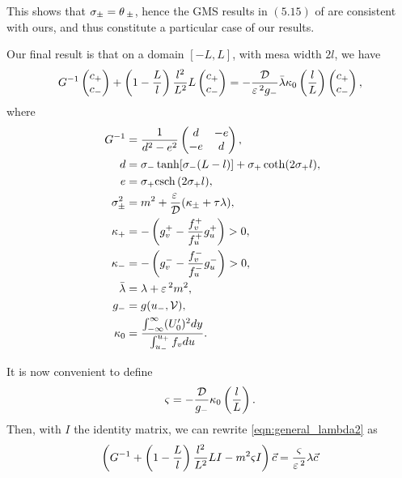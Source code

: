 This shows that $\sigma_{\pm} = \theta\,_{\pm}$, hence the GMS results in $(5.15)$ of \cite{kolokolnikov_stability_2005} are consistent with ours, and thus constitute a particular case of our results.

Our final result is that on a domain $[-L,L]$, with mesa width $2l$, we have
% 
\begin{equation}
\label{eqn:general_lambda2}
  G^{-1}\begin{pmatrix} c_+\\c_- \end{pmatrix} + \left(1-\frac{L}{l} \right)\frac{l^2}{L^2}L\begin{pmatrix} c_+\\c_- \end{pmatrix} = - \frac{\mathcal{D}}{\varepsilon\,^2g_-}\bar{\lambda}\kappa_0\left(\frac{l}{L}\right)\begin{pmatrix} c_+\\c_- \end{pmatrix},
\end{equation}
% 
where
% 
\[
\begin{split}
\begin{aligned}
  G^{-1} &= \frac{1}{d^2-e^2}\begin{pmatrix} d&-e\\-e&d \end{pmatrix},\\
  d&= \sigma_-\tanh[\sigma_-(L-l)] + \sigma_+\coth(2\sigma_+l),\\
  e&= \sigma_+\mathrm{csch} \,(2\sigma_+l),\\
  \quad\sigma_{\pm}^2 &= m^2  + \frac{\varepsilon\,}{\mathcal{D}}(\kappa_{\pm} + \tau\lambda),\\
  \kappa_+ &= - \left(g_v^+ - \frac{f_v^+}{f_u^+}g_u^+ \right)>0,\\
  \kappa_- &= - \left(g_v^- - \frac{f_v^-}{f_u^-}g_u^- \right)>0,\\
  \bar{\lambda} &= \lambda + \varepsilon\,^2m^2,\\
  g_- &= g(u_-,\mathcal{V}),\\
  \kappa_0&=\dfrac{\int_{-\infty}^{\infty}(U_0')^2 dy}{\int_{u_-}^{u_+}f_vdu}.
\end{aligned}
\end{split}
\]
%

It is now convenient to define
% 
\[
  \varsigma = -\frac{\mathcal{D}}{g_-}\kappa_0\left(\frac{l}{L} \right).
\]
% 
Then, with $I$ the identity matrix, we can rewrite \eqref{eqn:general_lambda2} as
% 
\[
  \left(G^{-1} + \left(1-\frac{L}{l} \right)\frac{l^2}{L^2}LI - m^2\varsigma I\right)\vec{c} = \frac{\varsigma}{\varepsilon\,^2}\lambda\vec{c}
\]
% 

